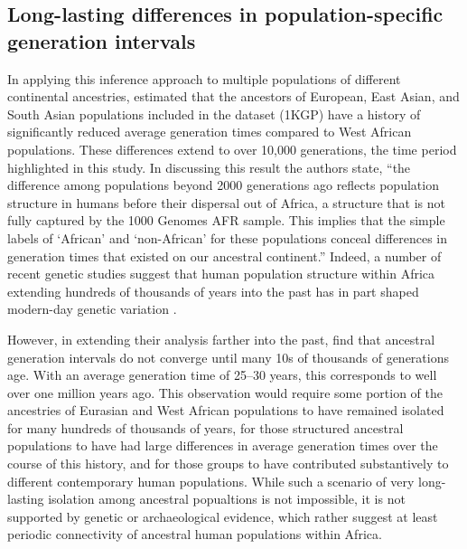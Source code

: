 \documentclass[]{article}
\begin{document}
\subsection*{Long-lasting differences in population-specific generation intervals}

In applying this inference approach to multiple populations of different
continental ancestries, \citet{wang2023human} estimated that the ancestors of
European, East Asian, and South Asian populations included in the
\citet{1000genomes2015} dataset (1KGP) have a history of significantly reduced
average generation times compared to West African populations. These
differences extend to over 10,000 generations, the time period highlighted in
this study. In discussing this result the authors state, ``the difference
among populations beyond 2000 generations ago reflects population structure in
humans before their dispersal out of Africa, a structure that is not fully
captured by the 1000 Genomes AFR sample. This implies that the simple labels
of `African' and `non-African' for these populations conceal differences in
generation times that existed on our ancestral continent.'' Indeed, a number of
recent genetic studies suggest that human population structure within Africa
extending hundreds of thousands of years into the past has in part shaped
modern-day genetic variation
\citep{plagnol2006possible,hammer2011genetic,hsieh2016model,hey2018phylogeny,
ragsdale2019models,durvasula2020recovering,lorente2019whole}.

However, in extending their analysis farther into the past,
\citeauthor{wang2023human} find that ancestral generation intervals do not
converge until many 10s of thousands of generations age. With an average
generation time of 25--30 years, this corresponds to well over one million
years ago. This observation would require some portion of the ancestries of
Eurasian and West African populations to have remained isolated for many
hundreds of thousands of years, for those structured ancestral populations to
have had large differences in average generation times over the course of this
history, and for those groups to have contributed substantively to different
contemporary human populations. While such a scenario of very long-lasting
isolation among ancestral popualtions is not impossible, it is not supported by
genetic \citep{ragsdale2022weakly,others} or archaeological
\citep{scerri2018did,others} evidence, which rather suggest at least periodic
connectivity of ancestral human populations within Africa.
\end{document}
